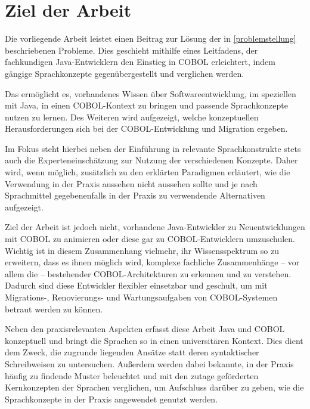 \section{Ziel der Arbeit}
Die vorliegende Arbeit leistet einen Beitrag zur Lösung der in \autoref{problemstellung} beschriebenen Probleme. Dies geschieht mithilfe eines Leitfadens, der fachkundigen Java-Entwicklern den Einstieg in COBOL erleichtert, indem gängige Sprachkonzepte gegenübergestellt und verglichen werden. 

Das ermöglicht es, vorhandenes Wissen über Softwareentwicklung, im speziellen mit Java, in einen COBOL-Kontext zu bringen und passende Sprachkonzepte nutzen zu lernen. Des Weiteren wird aufgezeigt, welche konzeptuellen Herausforderungen sich bei der COBOL-Entwicklung und Migration ergeben.

Im Fokus steht hierbei neben der Einführung in relevante Sprachkonstrukte stets auch die Experteneinschätzung zur Nutzung der verschiedenen Konzepte. Daher wird, wenn möglich, zusätzlich zu den erklärten Paradigmen erläutert, wie die Verwendung in der Praxis aussehen \bzw nicht aussehen sollte und je nach Sprachmittel gegebenenfalls in der Praxis zu verwendende Alternativen aufgezeigt.

Ziel der Arbeit ist jedoch nicht, vorhandene Java-Entwickler zu Neuentwicklungen mit COBOL zu animieren oder diese gar zu COBOL-Entwicklern umzuschulen. Wichtig ist in diesem Zusammenhang vielmehr, ihr Wissensspektrum so zu erweitern, dass es ihnen möglich wird, komplexe fachliche Zusammenhänge -- vor allem die  -- bestehender COBOL-Architekturen zu erkennen und zu verstehen. Dadurch sind diese Entwickler flexibler einsetzbar und geschult, um mit Migrations-, Renovierungs- und Wartungsaufgaben von COBOL-Systemen betraut werden zu können.

Neben den praxisrelevanten Aspekten erfasst diese Arbeit Java und COBOL konzeptuell und bringt die Sprachen so in einen universitären Kontext. Dies dient dem Zweck, die zugrunde liegenden Ansätze statt deren syntaktischer Schreibweisen zu untersuchen. Außerdem werden dabei bekannte, in der Praxis häufig zu findende Muster beleuchtet und mit den zutage geförderten Kernkonzepten der Sprachen verglichen, um Aufschluss darüber zu geben, wie die Sprachkonzepte in der Praxis angewendet \bzw genutzt werden.